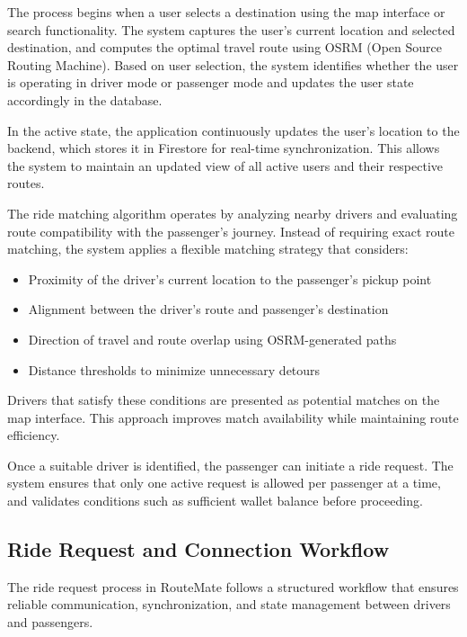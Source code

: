 \documentclass[10pt,a4paper]{report}
\begin{document}
\justify\large The process begins when a user selects a destination using the map interface or search functionality. The system captures the user’s current location and selected destination, and computes the optimal travel route using OSRM (Open Source Routing Machine). Based on user selection, the system identifies whether the user is operating in driver mode or passenger mode and updates the user state accordingly in the database.

\justify\large In the active state, the application continuously updates the user’s location to the backend, which stores it in Firestore for real-time synchronization. This allows the system to maintain an updated view of all active users and their respective routes.

\justify\large The ride matching algorithm operates by analyzing nearby drivers and evaluating route compatibility with the passenger’s journey. Instead of requiring exact route matching, the system applies a flexible matching strategy that considers:

\begin{itemize}
\item Proximity of the driver’s current location to the passenger’s pickup point
\item Alignment between the driver’s route and passenger’s destination
\item Direction of travel and route overlap using OSRM-generated paths
\item Distance thresholds to minimize unnecessary detours
\end{itemize}

\justify\large Drivers that satisfy these conditions are presented as potential matches on the map interface. This approach improves match availability while maintaining route efficiency.

\justify\large Once a suitable driver is identified, the passenger can initiate a ride request. The system ensures that only one active request is allowed per passenger at a time, and validates conditions such as sufficient wallet balance before proceeding.

\subsection{Ride Request and Connection Workflow}

\justify\large The ride request process in RouteMate follows a structured workflow that ensures reliable communication, synchronization, and state management between drivers and passengers.
\end{document}

